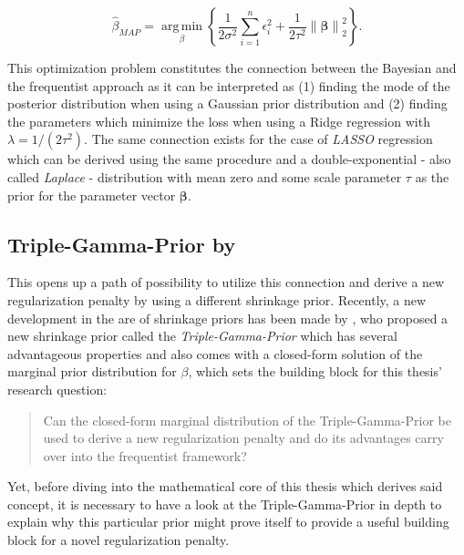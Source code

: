 \documentclass[12pt,a4paper]{article}
\newcommand{\norm}[1]{\left\lVert#1\right\rVert}
\DeclareMathOperator*{\argmin}{arg\,min}
\begin{document}
$$\hat{\beta}_{MAP} = \underset{\beta}{\argmin}\left\{\frac{1}{2\sigma^2}\sum_{i=1}^n \epsilon_i^2  + \frac{1}{2\tau^2}\norm{\mathbf{\beta}}_2^2\right\}.$$

This optimization problem constitutes the connection between the Bayesian and the frequentist approach as it can be interpreted as (1) finding the mode of the posterior distribution when using a Gaussian prior distribution and (2) finding the parameters which minimize the loss when using a Ridge regression with $\lambda = 1/(2\tau^2)$. The same connection exists for the case of \textit{LASSO} regression which can be derived using the same procedure and a double-exponential - also called \textit{Laplace} - distribution with mean zero and some scale parameter $\tau$ as the prior for the parameter vector $\mathbf{\beta}$. 

\subsection{Triple-Gamma-Prior by \textcite{TGP2020}}
This opens up a path of possibility to utilize this connection and derive a new regularization penalty by using a different shrinkage prior. Recently, a new development in the are of shrinkage priors has been made by \textcite{TGP2020}, who proposed a new shrinkage prior called the \textit{Triple-Gamma-Prior} which has several advantageous properties and also comes with a closed-form solution of the marginal prior distribution for $\beta$, which sets the building block for this thesis' research question:

\begin{quote}
Can the closed-form marginal distribution of the Triple-Gamma-Prior
be used to derive a new regularization penalty and do its advantages
carry over into the frequentist framework?
\end{quote}

Yet, before diving into the mathematical core of this thesis which derives said concept, it is necessary to have a look at the Triple-Gamma-Prior in depth to explain why this particular prior might prove itself to provide a useful building block for a novel regularization penalty.\\
\end{document}
